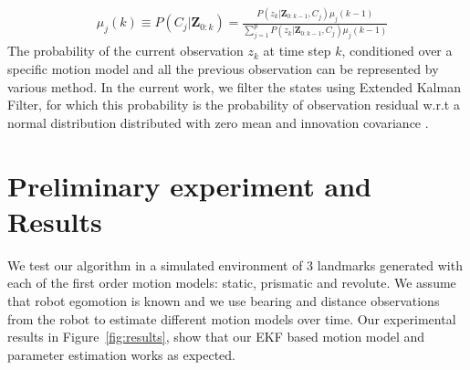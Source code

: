 \documentclass[10pt,twocolumn,letterpaper]{article}
\begin{document}
\begin{align*}
& \mu_j(k) \equiv P(C_j|\mathbf{Z}_{0:k})  = 
  \frac{P(z_k|\mathbf{Z}_{0:k-1}, C_j)\mu_j(k-1)}{\sum_{j=1}^{p} P(z_k|\mathbf{Z}_{0:k-1}, C_j)\mu_j(k-1) }
\end{align*}
The probability of the current observation $z_k$ at time step $k$, conditioned over a specific motion model and all the previous observation can be represented by various method. In the current work, we filter the states using Extended Kalman Filter, for which this probability is the probability of observation residual w.r.t a normal distribution distributed with zero mean and innovation covariance \cite{yaakov2001estimation}.


\section{Preliminary experiment and Results}
We test our algorithm in a simulated environment of 3 landmarks generated with each of the first order motion models: static, prismatic and revolute. We assume that robot egomotion is known and we use bearing and distance observations from the robot to estimate different motion models over time. 
Our experimental results in Figure~\ref{fig:results}, show that our EKF based motion model and parameter estimation works as expected.

{\small


}
\end{document}
